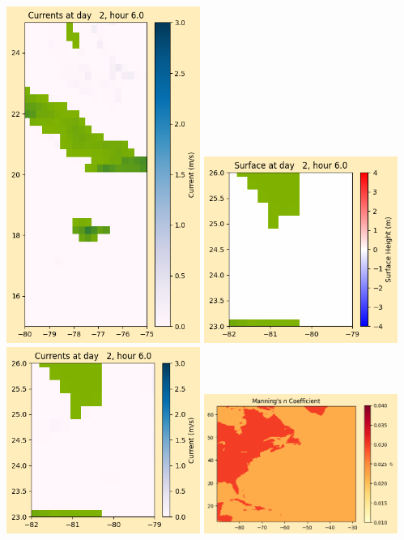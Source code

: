 \documentclass[11pt]{article}
\begin{document}
\includegraphics[width=0.475\textwidth]{frame0021fig1008.png}
\vskip 10pt 
\includegraphics[width=0.475\textwidth]{frame0021fig1009.png}
\includegraphics[width=0.475\textwidth]{frame0021fig1010.png}
\vskip 10pt 
\includegraphics[width=0.475\textwidth]{frame0021fig1011.png}
\end{document}
